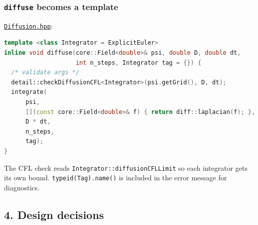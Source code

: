 \subsubsection{\texorpdfstring{\texttt{diffuse} becomes a
template}{diffuse becomes a template}}\label{diffuse-becomes-a-template}

\href{../../../include/gridcalc/solve/Diffusion.hpp}{\passthrough{\lstinline!Diffusion.hpp!}}:

\begin{lstlisting}[language={C++}]
template <class Integrator = ExplicitEuler>
inline void diffuse(core::Field<double>& psi, double D, double dt,
                    int n_steps, Integrator tag = {}) {
  /* validate args */
  detail::checkDiffusionCFL<Integrator>(psi.getGrid(), D, dt);
  integrate(
      psi,
      [](const core::Field<double>& f) { return diff::laplacian(f); },
      D * dt,
      n_steps,
      tag);
}
\end{lstlisting}

The CFL check reads
\passthrough{\lstinline!Integrator::diffusionCFLLimit!} so each
integrator gets its own bound.
\passthrough{\lstinline!typeid(Tag).name()!} is included in the error
message for diagnostics.

\subsection{4. Design decisions}\label{design-decisions}

